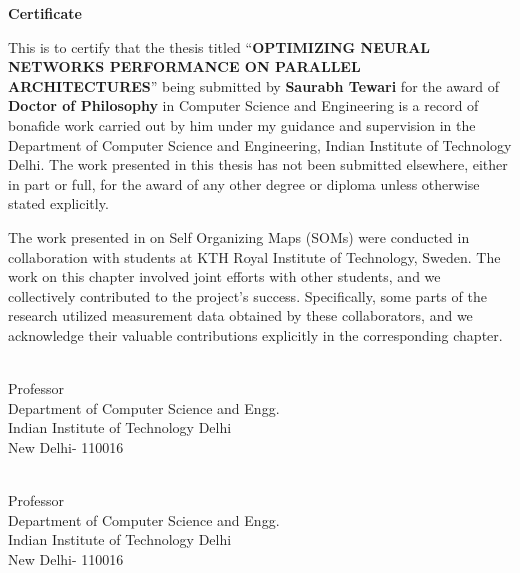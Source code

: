 {}
\begin{center}
	{\Huge \textbf{Certificate}} 
\end{center}

This is to certify that the thesis titled ``\textbf{OPTIMIZING NEURAL NETWORKS
	PERFORMANCE ON PARALLEL
	ARCHITECTURES}'' being submitted by  \textbf{Saurabh Tewari} for the award of \textbf{Doctor of Philosophy} in Computer Science and Engineering is a record of bonafide work carried out by him  under my guidance and supervision in the Department of Computer Science and Engineering, Indian Institute of Technology Delhi. The work presented in this thesis has not been submitted elsewhere, either in part or full, for the award of any other degree or diploma unless otherwise stated explicitly. 

The work presented in  on Self Organizing Maps (SOMs) were conducted in collaboration with students at KTH Royal Institute of Technology, Sweden. The work on this chapter involved joint efforts with other students, and we collectively contributed to the project's success. Specifically, some parts of the research utilized measurement data obtained by these collaborators, and we acknowledge their valuable contributions explicitly in the corresponding chapter.

\vspace {10 pc}

\begin{multicols}{2}
 \\
Professor \\
Department of Computer Science and Engg. \\
Indian Institute of Technology Delhi \\
New Delhi- 110016 \\
\columnbreak

\\
Professor \\
Department of Computer Science and Engg.\\
Indian Institute of Technology Delhi \\
New Delhi- 110016
\end{multicols}